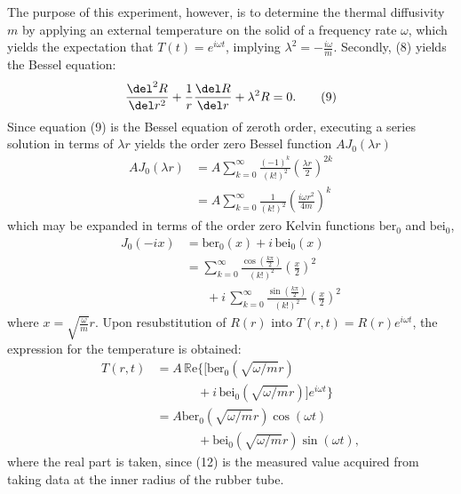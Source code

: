 \documentclass[11pt]{article}
\begin{document}
\begin{multicols}{2}
    The purpose of this experiment, however, is to determine the thermal diffusivity $m$ by applying an external temperature on the solid of a frequency rate $\omega$, which yields the expectation that $T(t) = e^{i\omega t}$, implying $\lambda^2 = -\frac{i\omega}{m}$. Secondly, (8) yields the Bessel equation:
    \[
        \frac{\del^2 R}{\del r^2} + \frac{1}{r}\frac{\del R}{\del r} + \lambda^2 R = 0. \tag{9}
    \]
    Since equation (9) is the Bessel equation of zeroth order, executing a series solution in terms of $\lambda r$ yields the order zero Bessel function $A J_0(\lambda r)$
    \begin{align*}
        AJ_0(\lambda r) &= A\sum_{k=0}^{\infty}\frac{(-1)^k}{(k!)^2}\left(\frac{\lambda r}{2}\right)^{2k} \tag{10.1}  \\
        &=A\sum_{k=0}^{\infty}\frac{1}{(k!)^2}\left(\frac{i\omega r^2}{4m}\right)^{k} \tag{10.2}
    \end{align*}
    \nd which may be expanded in terms of the order zero Kelvin functions $\text{ber}_0$ and $\text{bei}_0$, 
    \begin{align*}
        J_0(-ix) &= \text{ber}_0(x) + i\, \text{bei}_0(x) \tag{11.1}\\ 
        &= \sum_{k=0}^{\infty} \frac{\cos\left(\frac{k\pi}{2}\right)}{(k!)^2}\left(\frac{x}{2}\right)^2\\
        &\hspace{20pt}+ i\, \sum_{k=0}^{\infty} \frac{\sin\left(\frac{k\pi}{2}\right)}{(k!)^2}\left(\frac{x}{2}\right)^2\tag{11.2} 
    \end{align*}
    \nd where $x = \sqrt{\frac{\omega}{m}}r$. Upon resubstitution of $R(r)$ into $T(r,t) = R(r)e^{i\omega t}$, the expression for the temperature is obtained: 
   \begin{align*}
        T(r, t) &= A\, \mathbb{R}\text{e}\bigg\{\bigg[\text{ber}_0(\sqrt{\omega/m}r)\\
        &\hspace{40pt} + i\, \text{bei}_0(\sqrt{\omega/m}r)\bigg]e^{i\omega t}\bigg\} \\
        &=   A\text{ber}_0(\sqrt{\omega/m}r)\cos(\omega t) \\
        & \hspace{40pt} +  \text{bei}_0(\sqrt{\omega/m}r)\sin(\omega t),  \tag{12}
    \end{align*} 
    \nd where the real part is taken, since (12) is the measured value acquired from taking data at the inner radius of the rubber tube.






\end{multicols}
\end{document}
